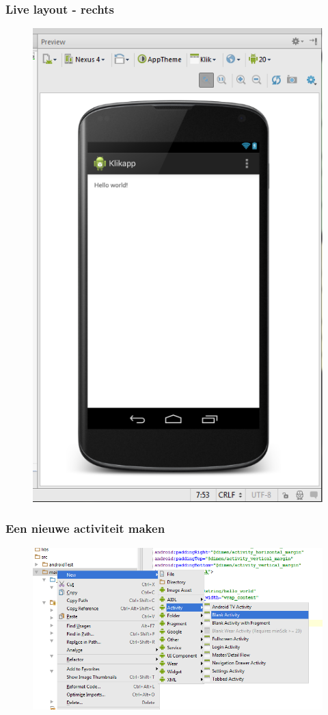 \documentclass[11pt]{beamer}
\begin{document}
\begin{frame}
\frametitle{Live layout - rechts}
\begin{figure}
\centering
\includegraphics[height=.9\textheight]{./asinterface4}
\label{fig:asinterface4}
\end{figure}
\end{frame}

\begin{frame}
\frametitle{Een nieuwe activiteit maken} \pause
\begin{figure}
\centering
\includegraphics[width=1.0\linewidth]{./newactivity2}
\label{fig:newactivity2}
\end{figure}
\end{frame}
\end{document}

